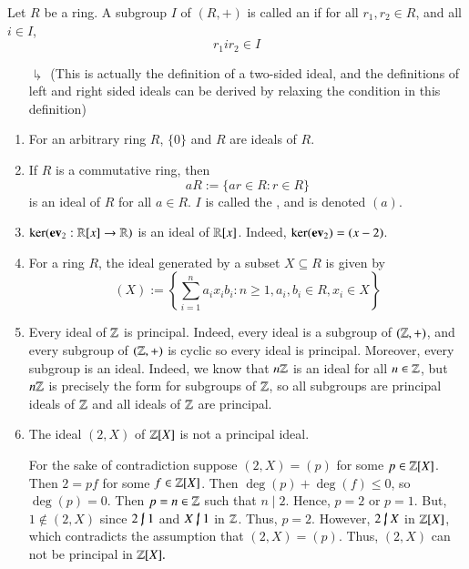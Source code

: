 \documentclass[12pt, a4paper, twoside, openright, titlepage]{book}
\begin{document}
\begin{defn}{}{}
    Let $R$ be a ring. A subgroup $I$ of $(R,+)$ is called an  if for all $r_1,r_2 \in R$, and all $i \in I$, \begin{equation}
        r_1ir_2 \in I
    \end{equation}
     \begin{enumerate}
         \item[$\drsh$] (This is actually the definition of a two-sided ideal, and the definitions of left and right sided ideals can be derived by relaxing the condition in this definition) 
     \end{enumerate}
\end{defn}

\begin{eg}{}{}
    \leavevmode
    \begin{enumerate}
        \item For an arbitrary ring $R$, $\{0\}$ and $R$ are ideals of $R$.
        \item If $R$ is a commutative ring, then \begin{equation}
            aR := \{ar \in R: r \in R\}
        \end{equation}
        is an ideal of $R$ for all $a \in R$. $I$ is called the , and is denoted $(a)$.
        \item $\ker(\operatorname{\bf{ev}}_2:\mathbb R[x]\rightarrow \mathbb R)$ is an ideal of $\mathbb R[x]$. Indeed, $\ker(\operatorname{\bf{ev}}_2) = (x-2)$.
        \item For a ring $R$, the ideal generated by a subset $X \subseteq R$ is given by \begin{equation}
            (X) := \left\{\sum\limits_{i=1}^na_ix_ib_i: n \geq 1, a_i,b_i \in R, x_i \in X\right\}
        \end{equation}
        \item Every ideal of $\mathbb Z$ is principal. Indeed, every ideal is a subgroup of $(\mathbb Z,+)$, and every subgroup of $(\mathbb Z,+)$ is cyclic so every ideal is principal. Moreover, every subgroup is an ideal. Indeed, we know that $n\mathbb Z$ is an ideal for all $n \in \mathbb Z$, but $n\mathbb Z$ is precisely the form for subgroups of $\mathbb Z$, so all subgroups are principal ideals of $\mathbb Z$ and all ideals of $\mathbb Z$ are principal.
        \item The ideal $(2,X)$ of $\mathbb Z[X]$ is not a principal ideal.
        \begin{proof*}{}{}
            For the sake of contradiction suppose $(2,X) = (p)$ for some $p \in \mathbb Z[X]$. Then $2 = pf$ for some $f \in \mathbb Z[X]$. Then $\deg(p) + \deg(f) \leq 0$, so $\deg(p) = 0$. Then $p = n \in \mathbb Z$ such that $n\;\vert\;2$. Hence, $p = 2$ or $p = 1$. But, $1 \notin (2,X)$ since $2 \;\cancel{\vert}\;1$ and $X\;\cancel{\vert}\;1$ in $\mathbb Z$. Thus, $p = 2$. However, $2\;\cancel{\vert}\;X$ in $\mathbb Z[X]$, which contradicts the assumption that $(2,X) = (p)$. Thus, $(2,X)$ can not be principal in $\mathbb Z[X].$
        \end{proof*}
    \end{enumerate}
\end{eg}
\end{document}
